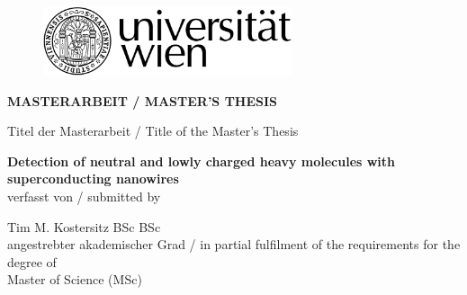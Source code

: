 ﻿\begin{titlepage}

\begin{center}
\begin{figure}
\hspace{9.1cm}
\includegraphics[width=7.31cm]{figures/uni_logo.png}
\end{figure}
\vspace*{2.1cm}

\fontsize{22}{0} \selectfont \textbf{ MASTERARBEIT / MASTER'S THESIS}\\
\vspace*{2.5cm}

\fontsize{11}{0} \selectfont Titel der Masterarbeit / Title of the Master's Thesis\\
\vspace*{0.4cm}

\fontsize{18}{0} \selectfont \textbf{\glqq Detection of neutral and lowly charged heavy molecules with superconducting nanowires\grqq}\\

\vspace*{2.8cm}
{\fontsize{11}{0} \selectfont verfasst von / submitted by}\\
\vspace*{0.4cm}

{ \fontsize{14}{0} \selectfont Tim M. Kostersitz BSc BSc\\}
\vspace*{1.6cm}
{ \fontsize{11}{0} \selectfont angestrebter akademischer Grad / in partial fulfilment of the requirements for the degree of}\\
\vspace*{0.4cm}
{ \fontsize{14}{0} \selectfont  Master of Science (MSc)}
\vspace*{2.4cm}


\end{center}
\end{titlepage}
